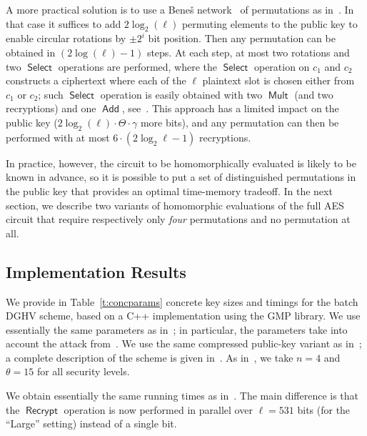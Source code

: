 \documentclass{llncs}
\DeclareMathOperator{\Recrypt}{\ensuremath{\mathsf{Recrypt}}}
\DeclareMathOperator{\Add}{\ensuremath{\mathsf{Add}}}
\DeclareMathOperator{\Mult}{\ensuremath{\mathsf{Mult}}}
\DeclareMathOperator{\Select}{\ensuremath{\mathsf{Select}}}
\newcommand\ignore[1]{}
\begin{document}
A more practical solution is to use a Bene\v{s} network~\cite{Ben1964} of
permutations as in~\cite{GHS2012a}. In that case it suffices to add
$2\log_2(\ell)$ permuting elements to the public key to enable circular
rotations by $\pm 2^i$ bit position. Then any permutation can be obtained
in $(2\log(\ell)-1)$ steps. At each step, at most two rotations and two
$\Select$ operations are performed, where the $\Select$ operation on
$c_1$ and $c_2$ constructs a ciphertext where each of the $\ell$
plaintext slot is chosen either from $c_1$ or $c_2$; such $\Select$
operation is easily obtained with two $\Mult$ (and two recryptions)
and one $\Add$, see~\cite{GHS2012a}. This approach has a
limited impact on the public key ($2\log_2(\ell)\cdot \Theta\cdot \gamma$
more bits), and any permutation can then be performed with at most
$6 \cdot (2 \log_2 \ell-1)$ recryptions.

In practice, however, the circuit to be homomorphically evaluated is
likely to be known in advance, so it is possible to put a set of
distinguished permutations in the public key that provides an optimal
time-memory tradeoff. In the next section, we describe two variants of
homomorphic evaluations of the full AES circuit that require respectively only
\emph{four} permutations and no permutation
at all.

\subsection{Implementation Results}\label{subsec:practical-implementation}

We provide  in Table~\ref{t:concparams} concrete key sizes and timings
for the batch DGHV scheme\ignore{ of Section~\ref{sec:batch-error-free}}, 
based on a C++ implementation using the GMP
library. We use essentially the same parameters as
in~\cite{CNT2012,FHEGITHUB}; in particular, the parameters take into
account the attack from~\cite{CN2012}. We use the same compressed
public-key variant as in~\cite{CNT2012}; a complete
description of the scheme is given in~\cite{CLT2013a}.   As
in~\cite{CMNT2011,CNT2012}, we take $n=4$ and $\theta=15$ for all
security levels. 

We obtain essentially the same running times as in~\cite{CNT2012}. The
main difference is that the $\Recrypt$ operation is now performed in
parallel over $\ell=531$ bits (for the ``Large'' setting) instead of a
single bit. 
\end{document}
